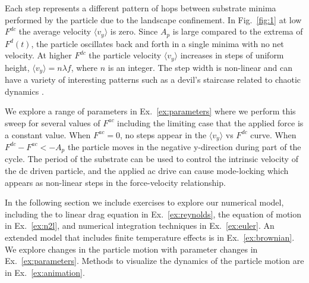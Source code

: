 \documentclass[twocolumn,preprintnumbers,amsmath,amssymb,aps,prx]{revtex4}
\begin{document}
Each step represents a different pattern of hops
between substrate minima
performed by the particle
due to the landscape confinement.  
In Fig.~\ref{fig:1} at %
low $F^{dc}$ the average velocity $\langle v_y \rangle$ is zero.
Since 
$A_p$ is large compared to the extrema of $F^{d}(t)$,
the particle oscillates back and forth
in a single minima with no net velocity.
At higher $F^{dc}$ the particle velocity 
$\langle v_{y} \rangle$ increases in steps of uniform height,
$\langle v_{y} \rangle = n \lambda f$,
where $n$ is an integer.
The step width is non-linear 
and can have a variety of
interesting patterns
such as a devil's staircase related to chaotic dynamics \cite{Bak1986}.


We explore a range of parameters in Ex.~\ref{ex:parameters}
where 
we perform this sweep for several values
of $F^{ac}$ including the limiting case that the applied force
is a constant value.
When $F^{ac} = 0$, no steps appear
in the $\langle v_y \rangle $ vs $F^{dc}$ curve. 
When $F^{dc} - F^{ac} < -A_p$ the particle
moves in the negative y-direction 
during part of the cycle.
The period of the substrate
can be used to control the
intrinsic velocity of the dc driven particle,
and the applied ac drive can cause mode-locking
which appears as non-linear 
steps in the force-velocity relationship.

In the following section
we include exercises to explore our numerical model,
including the 
to linear drag equation in Ex.~\ref{ex:reynolds}, 
the equation of motion in Ex.~\ref{ex:n2l},
and 
numerical integration techniques in Ex.~\ref{ex:euler}.
An extended model that includes finite temperature effects
is in Ex.~\ref{ex:brownian}.
We explore changes in the particle motion
with parameter changes in Ex.~\ref{ex:parameters}.
Methods to visualize the dynamics of the particle motion
are in Ex.~\ref{ex:animation}.
\end{document}

